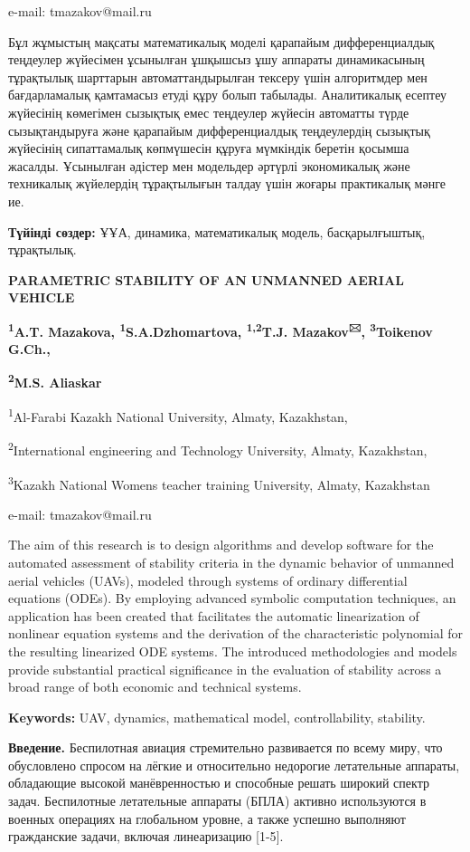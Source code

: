 e-mail: tmazakov@mail.ru

Бұл жұмыстың мақсаты математикалық моделі қарапайым дифференциалдық
теңдеулер жүйесімен ұсынылған ұшқышсыз ұшу аппараты динамикасының
тұрақтылық шарттарын автоматтандырылған тексеру үшін алгоритмдер мен
бағдарламалық қамтамасыз етуді құру болып табылады. Аналитикалық есептеу
жүйесінің көмегімен сызықтық емес теңдеулер жүйесін автоматты түрде
сызықтандыруға және қарапайым дифференциалдық теңдеулердің сызықтық
жүйесінің сипаттамалық көпмүшесін құруға мүмкіндік беретін қосымша
жасалды. Ұсынылған әдістер мен модельдер әртүрлі экономикалық және
техникалық жүйелердің тұрақтылығын талдау үшін жоғары практикалық мәнге
ие.

{\bfseries Түйінді сөздер:} ҰҰА, динамика, математикалық модель,
басқарылғыштық, тұрақтылық.

{\bfseries PARAMETRIC STABILITY OF AN UNMANNED AERIAL VEHICLE}

{\bfseries \textsuperscript{1}A.T. Mazakova,
\textsuperscript{1}S.A.Dzhomartova, \textsuperscript{1,2}T.J.
Mazakov\textsuperscript{🖂}, \textsuperscript{3}Toikenov G.Ch.,}

{\bfseries \textsuperscript{2}M.S. Aliaskar}

\textsuperscript{1}Al-Farabi Kazakh National University, Almaty,
Kazakhstan,

\textsuperscript{2}International engineering and Technology University,
Almaty, Kazakhstan,

\textsuperscript{3}Kazakh National Women\textquotesingle s teacher
training University, Almaty, Kazakhstan

e-mail: tmazakov@mail.ru

The aim of this research is to design algorithms and develop software
for the automated assessment of stability criteria in the dynamic
behavior of unmanned aerial vehicles (UAVs), modeled through systems of
ordinary differential equations (ODEs). By employing advanced symbolic
computation techniques, an application has been created that facilitates
the automatic linearization of nonlinear equation systems and the
derivation of the characteristic polynomial for the resulting linearized
ODE systems. The introduced methodologies and models provide substantial
practical significance in the evaluation of stability across a broad
range of both economic and technical systems.

{\bfseries Keywords:} UAV, dynamics, mathematical model, controllability,
stability.

{\bfseries Введение.} Беспилотная авиация стремительно развивается по всему
миру, что обусловлено спросом на лёгкие и относительно недорогие
летательные аппараты, обладающие высокой манёвренностью и способные
решать широкий спектр задач. Беспилотные летательные аппараты (БПЛА)
активно используются в военных операциях на глобальном уровне, а также
успешно выполняют гражданские задачи, включая линеаризацию {[}1-5{]}.

